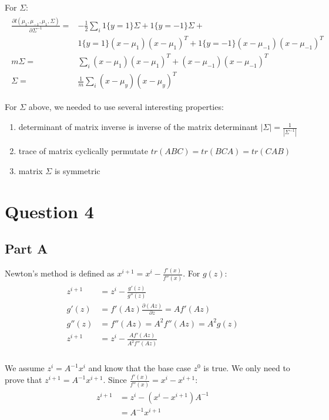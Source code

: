 \documentclass[11pt]{article}
\begin{document}
For $\Sigma$:
\begin{align}
	\begin{split}
		\frac{\partial l(\mu_1, \mu_{-1}, \mu_{1}, \Sigma)}{\partial \Sigma^{-1}} =& -\frac{1}{2}\sum_{i} 
		1\{y=1\}\Sigma + 1\{y=-1\}\Sigma + \\
		&1\{y=1\}(x-\mu_1)(x-\mu_1)^T + 1\{y=-1\}(x-\mu_{-1})(x-\mu_{-1})^T \\
		m\Sigma =& \sum_{i}(x-\mu_1)(x-\mu_1)^T + (x-\mu_{-1})(x-\mu_{-1})^T \\
		\Sigma =& \frac{1}{m}\sum_{i}(x-\mu_y)(x-\mu_y)^T 
	\end{split}
\end{align}

For $\Sigma$ above, we needed to use several interesting properties:
\begin{enumerate}
	\item determinant of matrix inverse is inverse of the matrix determinant $|\Sigma|= \frac{1}{|\Sigma^{-1}|}$
	\item trace of matrix cyclically permutate $tr(ABC)=tr(BCA)=tr(CAB)$
	\item matrix $\Sigma$ is symmetric
\end{enumerate}

\section*{Question 4}
\subsection*{Part A}
Newton's method is defined as $x^{i+1}=x^{i}-\frac{f'(x)}{f''(x)}$.
For $g(z)$:
\begin{align}
	\begin{split}
		z^{i+1} &= z^{i}-\frac{g'(z)}{g''(z)} \\
		g'(z) &= f'(Az)\frac{\partial (Az)}{\partial z}=Af'(Az) \\
	  g''(z) &= f''(Az) = A^2f''(Az) = A^2g(z) \\
		z^{i+1} &= z^{i} - \frac{Af'(Az)}{A^2f''(Az)} \\
	\end{split}
\end{align}

We assume $z^{i}=A^{-1}x^{i}$ and know that the base case $z^{0}$ is true. We only need to prove
that $z^{i+1}=A^{-1}x^{i+1}$. Since $\frac{f'(x)}{f''(x)}=x^{i}-x^{i+1}$:
\begin{align}
	\begin{split}
		z^{i+1} &= z^{i} - (x^{i}-x^{i+1})A^{-1} \\
		        &= A^{-1}x^{i+1}
	\end{split}
\end{align}
\end{document}
